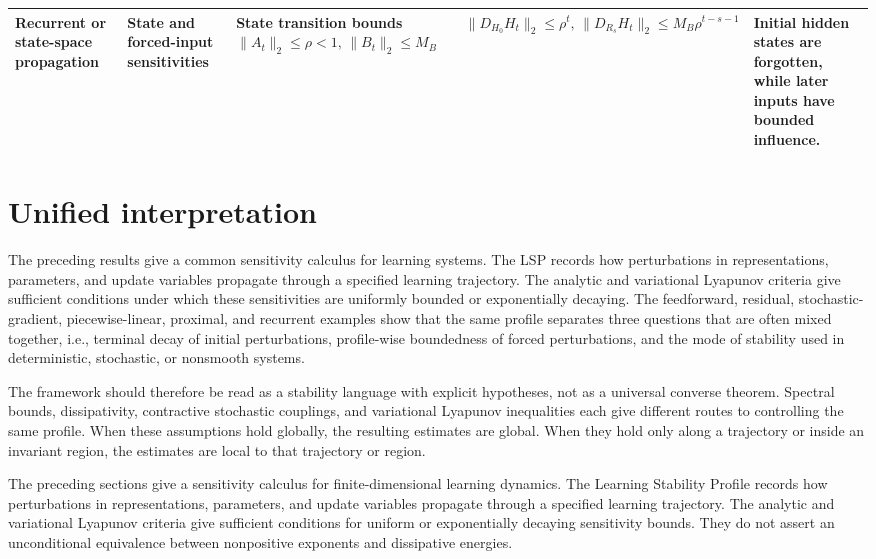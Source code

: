 \documentclass{article}
\numberwithin{equation}{section}
\begin{document}
\begin{table}[!htbp]
\begin{tabular}{p{2.0cm} | p{2.0cm} | p{4.50cm} | p{3.50cm} | p{3.90cm}}
Recurrent or state-space propagation
&
State and forced-input sensitivities
&
State transition bounds
\(
\|A_t\|_2\le\rho<1,
\,
\|B_t\|_2\le M_B
\)
&
\(
\|D_{H_0}H_t\|_2\le\rho^t,
\,
\|D_{R_s}H_t\|_2\le M_B\rho^{t-s-1}
\)
&
Initial hidden states are forgotten, while later inputs have bounded influence.
\\

\bottomrule
\end{tabular}
\end{table}

\section{Unified interpretation}
\label{sec:unified-interpretation}

The preceding results give a common sensitivity calculus for learning systems. The LSP records how perturbations in representations, parameters, and update variables propagate through a specified learning trajectory. The analytic and variational Lyapunov criteria give sufficient conditions under which these sensitivities are uniformly bounded or exponentially decaying. The feedforward, residual, stochastic-gradient, piecewise-linear, proximal, and recurrent examples show that the same profile separates three questions that are often mixed together, i.e., terminal decay of initial perturbations, profile-wise boundedness of forced perturbations, and the mode of stability used in deterministic, stochastic, or nonsmooth systems.

The framework should therefore be read as a stability language with explicit hypotheses, not as a universal converse theorem. Spectral bounds, dissipativity, contractive stochastic couplings, and variational Lyapunov inequalities each give different routes to controlling the same profile. When these assumptions hold globally, the resulting estimates are global. When they hold only along a trajectory or inside an invariant region, the estimates are local to that trajectory or region.

The preceding sections give a sensitivity calculus for finite-dimensional learning dynamics. The Learning Stability Profile records how perturbations in representations, parameters, and update variables propagate through a specified learning trajectory. The analytic and variational Lyapunov criteria give sufficient conditions for uniform or exponentially decaying sensitivity bounds. They do not assert an unconditional equivalence between nonpositive exponents
and dissipative energies.
\end{document}
